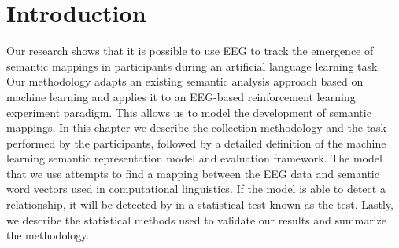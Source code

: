 \section{Introduction}

Our research shows that it is possible to use EEG to track the emergence of 
semantic mappings in participants during an artificial language learning task.  
Our methodology adapts an existing semantic analysis approach based on machine 
learning and applies it to an EEG-based reinforcement learning experiment 
paradigm. This allows us to model the development of semantic mappings. In this 
chapter we describe the collection methodology and the task performed by the 
participants, followed by a detailed definition of the machine learning 
semantic representation model and evaluation framework. The model that we use 
attempts to find a mapping between the EEG data and semantic word vectors used 
in computational linguistics. If the model is able to detect a relationship, it 
will be detected by in a statistical test known as the \tvt test. Lastly, we 
describe the statistical methods used to validate our results and summarize the 
methodology.
